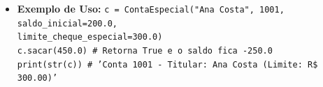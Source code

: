 \begin{enumerate}[label=\textbf{Q\arabic*.}, start=1]
\begin{itemize}[leftmargin=*]
    \item \textbf{Exemplo de Uso:}\newline
    \texttt{c = ContaEspecial("Ana Costa", 1001, saldo\_inicial=200.0,}\\\texttt{\phantom{c = ContaEspecial(}limite\_cheque\_especial=300.0)}\\\texttt{c.sacar(450.0)  \# Retorna True e o saldo fica -250.0}\\\texttt{print(str(c))    \# 'Conta 1001 - Titular: Ana Costa (Limite: R\$ 300.00)'}
\end{itemize}



\end{enumerate}
